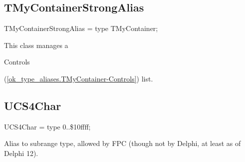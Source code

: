 \documentclass{report}
\newif\ifpdf
\begin{document}
\subsection*{TMyContainerStrongAlias}
\fi
\label{ok_type_aliases-TMyContainerStrongAlias}
\begin{list}{}{
\setlength{\itemindent}{0cm}
\setlength{\listparindent}{0cm}
\setlength{\leftmargin}{\evensidemargin}
\addtolength{\leftmargin}{\tmplength}
\settowidth{\labelsep}{X}
\addtolength{\leftmargin}{\labelsep}
\setlength{\labelwidth}{\tmplength}
}
\item[\textbf{Declaration}\hfill]
\ifpdf
\begin{flushleft}
\fi
\begin{ttfamily}
TMyContainerStrongAlias = type TMyContainer;\end{ttfamily}

\ifpdf
\end{flushleft}
\fi

\par
\item[\textbf{Description}]
This class manages a \begin{ttfamily}Controls\end{ttfamily}(\ref{ok_type_aliases.TMyContainer-Controls}) list.

\end{list}
\ifpdf
\subsection*{\large{\textbf{UCS4Char}}\normalsize\hspace{1ex}\hrulefill}
\else
\subsection*{UCS4Char}
\fi
\label{ok_type_aliases-UCS4Char}
\begin{list}{}{
\setlength{\itemindent}{0cm}
\setlength{\listparindent}{0cm}
\setlength{\leftmargin}{\evensidemargin}
\addtolength{\leftmargin}{\tmplength}
\settowidth{\labelsep}{X}
\addtolength{\leftmargin}{\labelsep}
\setlength{\labelwidth}{\tmplength}
}
\item[\textbf{Declaration}\hfill]
\ifpdf
\begin{flushleft}
\fi
\begin{ttfamily}
UCS4Char = type 0..{\$}10ffff;\end{ttfamily}

\ifpdf
\end{flushleft}
\fi

\par
\item[\textbf{Description}]
Alias to subrange type, allowed by FPC (though not by Delphi, at least as of Delphi 12).

\end{list}
\ifpdf
\end{document}
